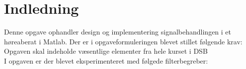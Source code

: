 \chapter{Indledning}\label{ch:introduction}
Denne opgave ophandler design og implementering signalbehandlingen i et høreaberat i Matlab. Der er i opgaveformuleringen blevet stillet følgende krav: Opgaven skal indeholde væsentlige elementer fra hele kurset i DSB \\I opgaven er der blevet eksperimenteret med følgede filterbegreber:

\begin{itemize}
\end{itemize}

